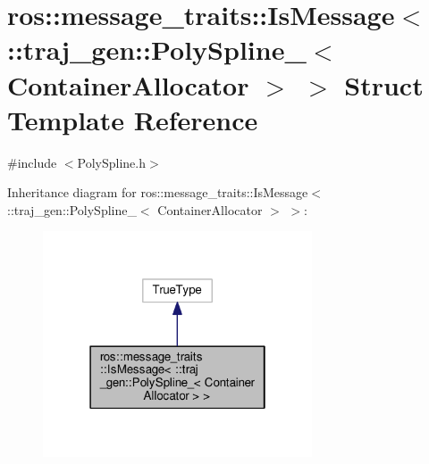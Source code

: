 \hypertarget{structros_1_1message__traits_1_1_is_message_3_01_1_1traj__gen_1_1_poly_spline___3_01_container_allocator_01_4_01_4}{}\section{ros\+:\+:message\+\_\+traits\+:\+:Is\+Message$<$ \+:\+:traj\+\_\+gen\+:\+:Poly\+Spline\+\_\+$<$ Container\+Allocator $>$ $>$ Struct Template Reference}
\label{structros_1_1message__traits_1_1_is_message_3_01_1_1traj__gen_1_1_poly_spline___3_01_container_allocator_01_4_01_4}


{\ttfamily \#include $<$Poly\+Spline.\+h$>$}



Inheritance diagram for ros\+:\+:message\+\_\+traits\+:\+:Is\+Message$<$ \+:\+:traj\+\_\+gen\+:\+:Poly\+Spline\+\_\+$<$ Container\+Allocator $>$ $>$\+:
\nopagebreak
\begin{figure}[H]
\begin{center}
\leavevmode
\includegraphics[width=226pt]{structros_1_1message__traits_1_1_is_message_3_01_1_1traj__gen_1_1_poly_spline___3_01_container_ae613278ee12a3b4b0445aa097c0fe351}
\end{center}
\end{figure}


